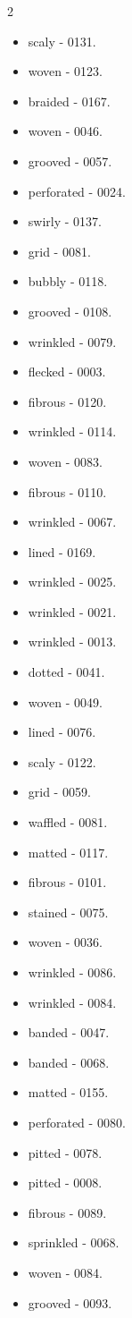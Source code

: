 \begin{multicols}{2}
\begin{itemize}
\item scaly - 0131.
\item woven - 0123.
\item braided - 0167.
\item woven - 0046.
\item grooved - 0057.
\item perforated - 0024.
\item swirly - 0137.
\item grid - 0081.
\item bubbly - 0118.
\item grooved - 0108.
\item wrinkled - 0079.
\item flecked - 0003.
\item fibrous - 0120.
\item wrinkled - 0114.
\item woven - 0083.
\item fibrous - 0110.
\item wrinkled - 0067.
\item lined - 0169.
\item wrinkled - 0025.
\item wrinkled - 0021.
\item wrinkled - 0013.
\item dotted - 0041.
\item woven - 0049.
\item lined - 0076.
\item scaly - 0122.
\item grid - 0059.
\item waffled - 0081.
\item matted - 0117.
\item fibrous - 0101.
\item stained - 0075.
\item woven - 0036.
\item wrinkled - 0086.
\item wrinkled - 0084.
\item banded - 0047.
\item banded - 0068.
\item matted - 0155.
\item perforated - 0080.
\item pitted - 0078.
\item pitted - 0008.
\item fibrous - 0089.
\item sprinkled - 0068.
\item woven - 0084.
\item grooved - 0093.

\end{itemize}
\end{multicols}

